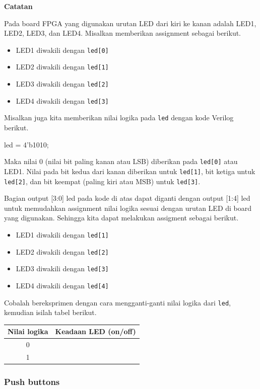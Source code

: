 \documentclass[a4paper,11pt,bahasa]{extarticle}
\begin{document}
\textbf{Catatan}

Pada board FPGA yang digunakan urutan LED dari kiri ke kanan adalah LED1,
LED2, LED3, dan LED4.
Misalkan memberikan assignment sebagai berikut.
\begin{itemize}
\item LED1 diwakili dengan {\tt led[0]}
\item LED2 diwakili dengan {\tt led[1]}
\item LED3 diwakili dengan {\tt led[2]}
\item LED4 diwakili dengan {\tt led[3]}
\end{itemize}
Misalkan juga kita memberikan nilai logika pada {\tt led} dengan
kode Verilog berikut.
\begin{verilogcode}
  led = 4'b1010;
\end{verilogcode}
Maka nilai 0 (nilai bit paling kanan atau LSB) diberikan pada {\tt led[0]}
atau LED1. Nilai pada bit kedua dari kanan diberikan untuk {\tt led[1]}, bit ketiga
untuk {\tt led[2]}, dan bit keempat (paling kiri atau MSB) untuk {\tt led[3]}.

Bagian {\sf output [3:0] led} pada kode di atas dapat diganti
dengan {\sf output [1:4] led} untuk memudahkan assignment nilai logika
sesuai dengan urutan LED di board yang digunakan. Sehingga kita dapat
melakukan assigment sebagai berikut.
\begin{itemize}
\item LED1 diwakili dengan {\tt led[1]}
\item LED2 diwakili dengan {\tt led[2]}
\item LED3 diwakili dengan {\tt led[3]}
\item LED4 diwakili dengan {\tt led[4]}
\end{itemize}

Cobalah bereksprimen dengan cara mengganti-ganti nilai logika
dari {\tt led}, kemudian isilah tabel berikut.

\begin{table}[H]
\centering
\begin{tabular}{|c|c|}
\hline
Nilai logika & Keadaan LED (on/off) \\
\hline
0 & \\
1 & \\
\hline
\end{tabular}
\par
\end{table}


\subsubsection{Push buttons}
\end{document}

